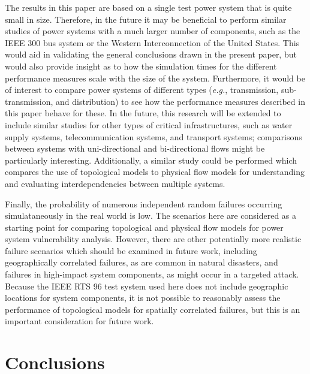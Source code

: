 The results in this paper are based on a single test power system that is quite small in size. Therefore, in the future it may be beneficial to perform similar studies of power systems with a much larger number of components, such as the IEEE 300 bus system or the Western Interconnection of the United States. This would aid in validating the general conclusions drawn in the present paper, but would also provide insight as to how the simulation times for the different performance measures scale with the size of the system. Furthermore, it would be of interest to compare power systems of different types (\emph{e.g.}, transmission, sub-transmission, and distribution) to see how the performance measures described in this paper behave for these. In the future, this research will be extended to include similar studies for other types of critical infrastructures, such as water supply systems, telecommunication systems, and transport systems; comparisons between systems with uni-directional and bi-directional flows might be particularly interesting.  Additionally, a similar study could be performed which compares the use of topological models to physical flow models for understanding and evaluating interdependencies between multiple systems.

Finally, the probability of numerous independent random failures occurring simulataneously in the real world is low.  The scenarios here are considered as a starting point for comparing topological and physical flow models for power system vulnerability analysis.  However, there are other potentially more realistic failure scenarios which should be examined in future work, including geographically correlated failures, as are common in natural disasters, and failures in high-impact system components, as might occur in a targeted attack.  Because the IEEE RTS 96 test system used here does not include geographic locations for system components, it is not possible to reasonably assess the performance of topological models for spatially correlated failures, but this is an important consideration for future work.


\section{Conclusions}
\label{sec:ch3:conclusions}

